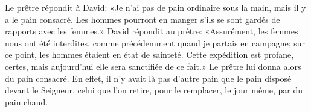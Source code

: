 Le prêtre répondit à David:
	«Je n’ai pas de pain ordinaire sous la main, mais il y a le pain consacré.
	Les hommes pourront en manger s’ils se sont gardés de rapports avec les femmes.»
David répondit au prêtre:
	«Assurément, les femmes nous ont été interdites,
	comme précédemment quand je partais en campagne;
	sur ce point, les hommes étaient en état de sainteté.
Cette expédition est profane, certes,
	mais aujourd’hui elle sera sanctifiée de ce fait.»
Le prêtre lui donna alors du pain consacré.
En effet, il n’y avait là pas d’autre pain que le pain disposé devant le Seigneur,
	celui que l’on retire, pour le remplacer, le jour même, par du pain chaud.
